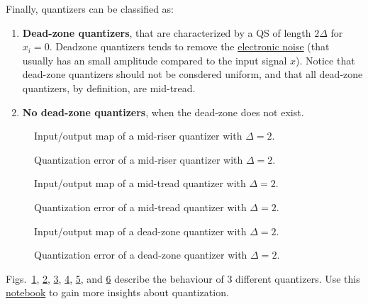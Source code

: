 Finally, quantizers can be classified as:
\begin{enumerate}
\item \textbf{Dead-zone quantizers}, that are characterized by a QS of
  length $2\Delta$ for $x_i=0$. Deadzone quantizers tends to remove
  the
  \href{https://en.wikipedia.org/wiki/Noise_(electronics)}{electronic
    noise} (that usually has an small amplitude compared to the input
  signal $x$). Notice that dead-zone quantizers should not be
  consdered uniform, and that all dead-zone quantizers, by definition,
  are mid-tread.
\item \textbf{No dead-zone quantizers}, when the dead-zone does not
  exist.
\end{enumerate}

\begin{figure}
  \centering
  \caption{Input/output map of a mid-riser quantizer with $\Delta=2$.}
  \label{fig:iomap_mr}
\end{figure}

\begin{figure}
  \centering
  \caption{Quantization error of a mid-riser quantizer with $\Delta=2$.}
  \label{fig:qe_mr}
\end{figure}

\begin{figure}
  \centering
  \caption{Input/output map of a mid-tread quantizer with $\Delta=2$.}
  \label{fig:iomap_mt}
\end{figure}

\begin{figure}
  \centering
  \caption{Quantization error of a mid-tread quantizer with $\Delta=2$.}
  \label{fig:qe_mt}
\end{figure}

\begin{figure}
  \centering
  \caption{Input/output map of a dead-zone quantizer with $\Delta=2$.}
  \label{fig:iomap_dz}
\end{figure}

\begin{figure}
  \centering
  \caption{Quantization error of a dead-zone quantizer with $\Delta=2$.}
  \label{fig:qe_dz}
\end{figure}

Figs.~\ref{fig:iomap_mr}, \ref{fig:qe_mr}, \ref{fig:iomap_mt},
\ref{fig:qe_mt}, \ref{fig:iomap_dz}, and \ref{fig:qe_dz} describe the
behaviour of 3 different quantizers.  Use this
\href{https://github.com/Sistemas-Multimedia/Sistemas-Multimedia.github.io/blob/master/study_guide/05-quantization/digital_quantization.ipynb}{notebook}
to gain more insights about quantization.

